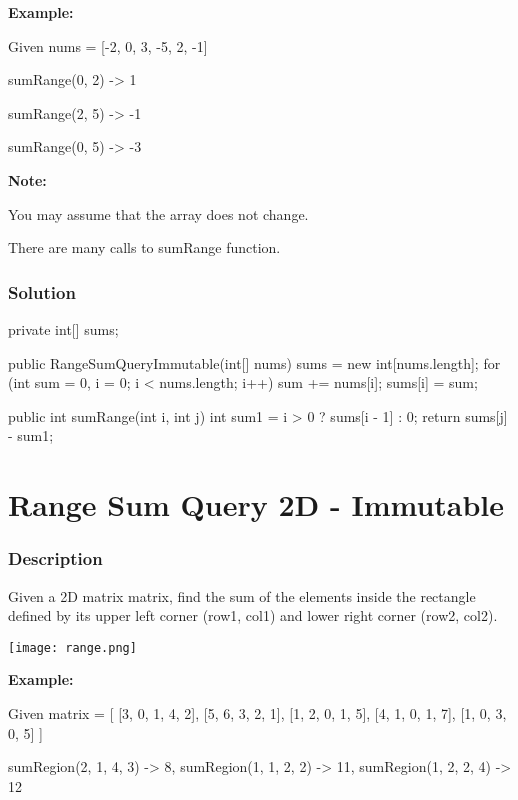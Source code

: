 \textbf{Example:}

Given nums = [-2, 0, 3, -5, 2, -1]

sumRange(0, 2) -> 1

sumRange(2, 5) -> -1

sumRange(0, 5) -> -3

\textbf{Note:}

You may assume that the array does not change.

There are many calls to sumRange function.

\subsubsection{Solution}

\begin{Code}
private int[] sums;

public RangeSumQueryImmutable(int[] nums) {
    sums = new int[nums.length];
    for (int sum = 0, i = 0; i < nums.length; i++) {
        sum += nums[i];
        sums[i] = sum;
    }
}

public int sumRange(int i, int j) {
    int sum1 = i > 0 ? sums[i - 1] : 0;
    return sums[j] - sum1;
}
\end{Code}

\newpage

\section{Range Sum Query 2D - Immutable} %

\subsubsection{Description}
Given a 2D matrix matrix, find the sum of the elements inside the rectangle defined by its upper left corner (row1, col1) and lower right corner (row2, col2).

\begin{center}
\texttt{[image: range.png]}
\end{center}

\textbf{Example:}
\begin{Code}
Given matrix = [
  [3, 0, 1, 4, 2],
  [5, 6, 3, 2, 1],
  [1, 2, 0, 1, 5],
  [4, 1, 0, 1, 7],
  [1, 0, 3, 0, 5]
]

sumRegion(2, 1, 4, 3) -> 8, sumRegion(1, 1, 2, 2) -> 11, sumRegion(1, 2, 2, 4) -> 12
\end{Code}

